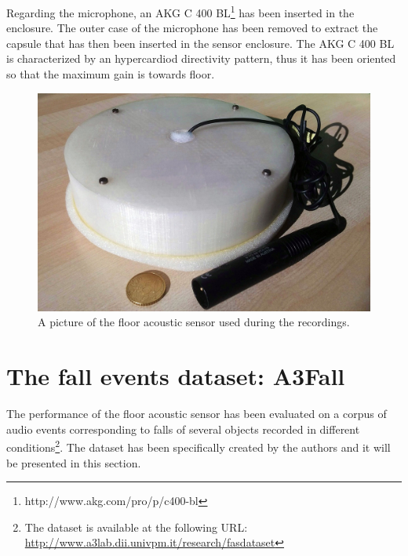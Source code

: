 Regarding the microphone, an AKG C 400 BL\footnote{http://www.akg.com/pro/p/c400-bl} has been inserted in the enclosure. The outer case of the microphone has been removed to extract the capsule that has then been inserted in the sensor enclosure. The AKG C 400 BL is characterized by an hypercardiod directivity pattern, thus it has been oriented so that the maximum gain is towards floor.

\begin{figure}[t]
	\centering
	\includegraphics[width=0.8\columnwidth]{img/FAS_front_little.jpg}
	\caption{A picture of the floor acoustic sensor used during the recordings.} 
	\label{fig:meringa}
\end{figure}

\section{The fall events dataset: A3Fall}
\label{sec:dataset}
The performance of the floor acoustic sensor has been evaluated on a corpus of audio events corresponding to falls of several objects recorded in different conditions\footnote{The dataset is available at the following URL: \url{http://www.a3lab.dii.univpm.it/research/fasdataset}}. The dataset has been specifically created by the authors and it will be presented in this section.

